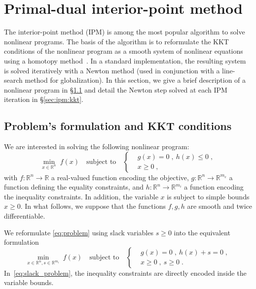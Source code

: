 \section{Primal-dual interior-point method}
The interior-point method (IPM) is among the most popular algorithm
to solve nonlinear programs. The basis of the algorithm is to
reformulate the KKT conditions of the nonlinear program as a smooth
system of nonlinear equations using a homotopy method~\cite{nocedal_numerical_2006}.
In a standard implementation, the
resulting system is solved iteratively with a Newton method (used in conjunction
with a line-search method for globalization). In this section, we
give a brief description of a nonlinear program in \S\ref{sec:ipm:problem}
and detail the Newton step solved at each IPM iteration in \S\ref{sec:ipm:kkt}.

\subsection{Problem's formulation and KKT conditions}
\label{sec:ipm:problem}
We are interested in solving the following nonlinear program:
\begin{equation}
  \label{eq:problem}
    \min_{x \in \mathbb{R}^n} \;  f(x)
\quad \text{subject to}\quad
\left\{
  \begin{aligned}
    & g(x) = 0 \; , ~ h(x) \leq 0 \; , \\
      & x \geq 0  \; ,
  \end{aligned}
\right.
\end{equation}
with $f:\mathbb{R}^n \to \mathbb{R}$ a real-valued function
encoding the objective, $g: \mathbb{R}^n \to \mathbb{R}^{m_e}$
a function defining the equality constraints, and $h: \mathbb{R}^{n} \to
\mathbb{R}^{m_i}$ a function encoding the inequality constraints.
In addition, the variable $x$ is subject to simple bounds $x \geq 0$.
In what follows, we suppose that the functions $f, g, h$ are smooth
and twice differentiable.

We reformulate \eqref{eq:problem} using slack variables $s \geq 0$
into the equivalent formulation
\begin{equation}
  \label{eq:slack_problem}
    \min_{x \in \mathbb{R}^n, s \in \mathbb{R}^{m_i}} \;  f(x)
    \quad \text{subject to} \quad
    \left\{
  \begin{aligned}
    & g(x) = 0 \; , ~ h(x) + s = 0 \; , \\
      & x \geq 0  \; , ~ s \geq 0  \; .
  \end{aligned}
  \right.
\end{equation}
In~\eqref{eq:slack_problem}, the inequality constraints
are directly encoded inside the variable bounds.

